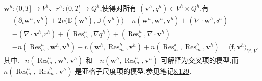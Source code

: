 \begin{note}
$\bm{w}^h:(0,T]\to V^h$、$r^h:(0,T]\to Q^h$,使得对所有
$(\bm{v}^h,q^h)\in V^h\times Q^h$,有
\begin{equation}\label{eq:vms-residual-based-resolved-formulation}
\begin{aligned}
 &(\partial_t\bm{w}^h,\bm{v}^h)
 +2\nu\bigl(\mathbb{D}(\bm{w}^h),\mathbb{D}(\bm{v}^h)\bigr)
 +n(\bm{w}^h,\bm{w}^h,\bm{v}^h)
 +(\nabla\cdot\bm{w}^h,q^h)\\
 &-(\nabla\cdot\bm{v}^h,r^h)
 +(\operatorname{Res}_m^h,\nabla q^h)
 +(\operatorname{Res}_c^h,\nabla\cdot\bm{v}^h)\\
 &-n(\operatorname{Res}_m^h,\bm{w}^h,\bm{v}^h)
 -n(\bm{w}^h,\operatorname{Res}_m^h,\bm{v}^h)
 +n(\operatorname{Res}_m^h,\operatorname{Res}_m^h,\bm{v}^h)
 =\langle\bm f,\bm{v}^h\rangle_{V',V}.
\end{aligned}
\end{equation}
其中,$-n(\operatorname{Res}_m^h,\bm{w}^h,\bm{v}^h)$ 和
$-n(\bm{w}^h,\operatorname{Res}_m^h,\bm{v}^h)$ 可解释为交叉项的模型,而
$n(\operatorname{Res}_m^h,\operatorname{Res}_m^h,\bm{v}^h)$ 是亚格子尺度项的模型,参见笔记\hyperref[note:les-model-basic-approach]{8.129}.
\end{note}

